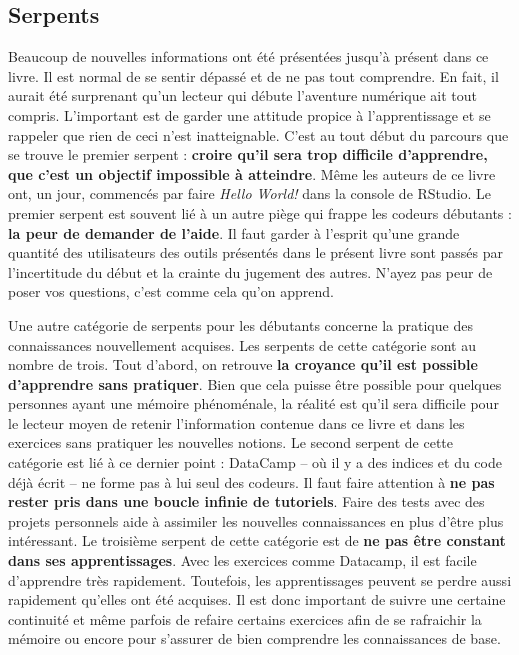 \documentclass[
  letterpaper,
]{scrbook}
\begin{document}
\hypertarget{serpents}{%
\subsection{Serpents}\label{serpents}}

Beaucoup de nouvelles informations ont été présentées jusqu'à présent
dans ce livre. Il est normal de se sentir dépassé et de ne pas tout
comprendre. En fait, il aurait été surprenant qu'un lecteur qui débute
l'aventure numérique ait tout compris. L'important est de garder une
attitude propice à l'apprentissage et se rappeler que rien de ceci n'est
inatteignable. C'est au tout début du parcours que se trouve le premier
serpent : \textbf{croire qu'il sera trop difficile d'apprendre, que
c'est un objectif impossible à atteindre}. Même les auteurs de ce livre
ont, un jour, commencés par faire \emph{Hello World!} dans la console de
RStudio. Le premier serpent est souvent lié à un autre piège qui frappe
les codeurs débutants : \textbf{la peur de demander de l'aide}. Il faut
garder à l'esprit qu'une grande quantité des utilisateurs des outils
présentés dans le présent livre sont passés par l'incertitude du début
et la crainte du jugement des autres. N'ayez pas peur de poser vos
questions, c'est comme cela qu'on apprend.

Une autre catégorie de serpents pour les débutants concerne la pratique
des connaissances nouvellement acquises. Les serpents de cette catégorie
sont au nombre de trois. Tout d'abord, on retrouve \textbf{la croyance
qu'il est possible d'apprendre sans pratiquer}. Bien que cela puisse
être possible pour quelques personnes ayant une mémoire phénoménale, la
réalité est qu'il sera difficile pour le lecteur moyen de retenir
l'information contenue dans ce livre et dans les exercices sans
pratiquer les nouvelles notions. Le second serpent de cette catégorie
est lié à ce dernier point : DataCamp -- où il y a des indices et du
code déjà écrit -- ne forme pas à lui seul des codeurs. Il faut faire
attention à \textbf{ne pas rester pris dans une boucle infinie de
tutoriels}. Faire des tests avec des projets personnels aide à assimiler
les nouvelles connaissances en plus d'être plus intéressant. Le
troisième serpent de cette catégorie est de \textbf{ne pas être constant
dans ses apprentissages}. Avec les exercices comme Datacamp, il est
facile d'apprendre très rapidement. Toutefois, les apprentissages
peuvent se perdre aussi rapidement qu'elles ont été acquises. Il est
donc important de suivre une certaine continuité et même parfois de
refaire certains exercices afin de se rafraichir la mémoire ou encore
pour s'assurer de bien comprendre les connaissances de base.
\end{document}
